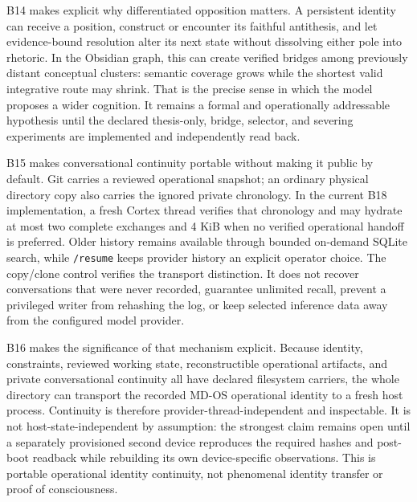 \documentclass[10pt,twocolumn]{article}
\theoremstyle{definition}
\theoremstyle{plain}
\theoremstyle{remark}
\newcommand{\file}[1]{\nolinkurl{#1}}
\begin{document}
B14 makes explicit why differentiated opposition matters.  A persistent identity can receive a position, construct or encounter its faithful antithesis, and let evidence-bound resolution alter its next state without dissolving either pole into rhetoric.  In the Obsidian graph, this can create verified bridges among previously distant conceptual clusters: semantic coverage grows while the shortest valid integrative route may shrink.  That is the precise sense in which the model proposes a wider cognition.  It remains a formal and operationally addressable hypothesis until the declared thesis-only, bridge, selector, and severing experiments are implemented and independently read back.

B15 makes conversational continuity portable without making it public by default.  Git carries a reviewed operational snapshot; an ordinary physical directory copy also carries the ignored private chronology.  In the current B18 implementation, a fresh Cortex thread verifies that chronology and may hydrate at most two complete exchanges and 4 KiB when no verified operational handoff is preferred.  Older history remains available through bounded on-demand SQLite search, while \file{/resume} keeps provider history an explicit operator choice.  The copy/clone control verifies the transport distinction.  It does not recover conversations that were never recorded, guarantee unlimited recall, prevent a privileged writer from rehashing the log, or keep selected inference data away from the configured model provider.

B16 makes the significance of that mechanism explicit.  Because identity, constraints, reviewed working state, reconstructible operational artifacts, and private conversational continuity all have declared filesystem carriers, the whole directory can transport the recorded MD-OS operational identity to a fresh host process.  Continuity is therefore provider-thread-independent and inspectable.  It is not host-state-independent by assumption: the strongest claim remains open until a separately provisioned second device reproduces the required hashes and post-boot readback while rebuilding its own device-specific observations.  This is portable operational identity continuity, not phenomenal identity transfer or proof of consciousness.
\end{document}

